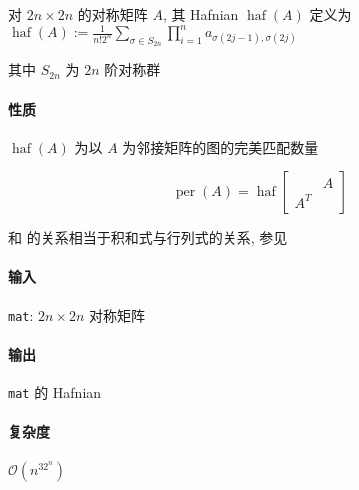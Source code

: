 对 \(2n\times 2n\) 的对称矩阵 \(A\), 其 Hafnian \(\operatorname{haf}(A)\) 定义为 \(\displaystyle\operatorname{haf}(A):=\frac{1}{n!2^n}\sum_{\sigma\in S_{2n}}\prod_{i=1}^n a_{\sigma(2j-1),\sigma(2j)}\)

其中 \(S_{2n}\) 为 \(2n\) 阶对称群

\paragraph{性质}

\(\operatorname{haf}(A)\) 为以 \(A\) 为邻接矩阵的图的完美匹配数量

\[
    \operatorname{per}(A)=\operatorname{haf}\begin{bmatrix}
            & A \\
        A^T & 
    \end{bmatrix}
\]

和  的关系相当于积和式与行列式的关系, 参见 

\paragraph{输入}

\verb|mat|: \(2n\times 2n\) 对称矩阵

\paragraph{输出}

\verb|mat| 的 Hafnian

\paragraph{复杂度}

\(\mathcal{O}(n^32^n)\)
